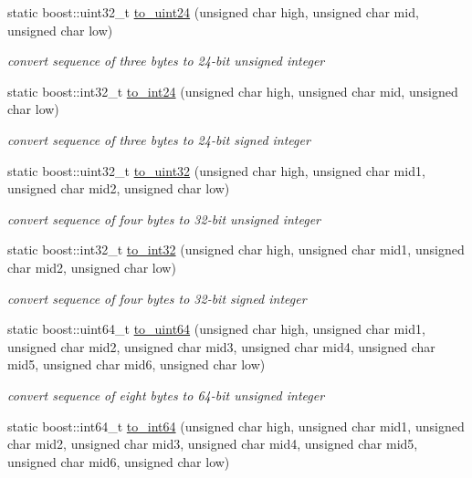 \begin{DoxyCompactItemize}
static boost\-::uint32\-\_\-t \hyperlink{structpion_1_1algorithm_ad1fd95bf2a6c3c2a775492c1acd0b5c1}{to\-\_\-uint24} (unsigned char high, unsigned char mid, unsigned char low)
\begin{DoxyCompactList}\small\item\em convert sequence of three bytes to 24-\/bit unsigned integer \end{DoxyCompactList}\item 
static boost\-::int32\-\_\-t \hyperlink{structpion_1_1algorithm_a607abc832ec9f6983cb42b76cc8914e6}{to\-\_\-int24} (unsigned char high, unsigned char mid, unsigned char low)
\begin{DoxyCompactList}\small\item\em convert sequence of three bytes to 24-\/bit signed integer \end{DoxyCompactList}\item 
static boost\-::uint32\-\_\-t \hyperlink{structpion_1_1algorithm_af2092366e2a82fbfc456bceb15a0f599}{to\-\_\-uint32} (unsigned char high, unsigned char mid1, unsigned char mid2, unsigned char low)
\begin{DoxyCompactList}\small\item\em convert sequence of four bytes to 32-\/bit unsigned integer \end{DoxyCompactList}\item 
static boost\-::int32\-\_\-t \hyperlink{structpion_1_1algorithm_ac8dd9cfadaa3fb758b4ea3f9bd524595}{to\-\_\-int32} (unsigned char high, unsigned char mid1, unsigned char mid2, unsigned char low)
\begin{DoxyCompactList}\small\item\em convert sequence of four bytes to 32-\/bit signed integer \end{DoxyCompactList}\item 
static boost\-::uint64\-\_\-t \hyperlink{structpion_1_1algorithm_ab4622cfb454d0ca206ffe42077a15c52}{to\-\_\-uint64} (unsigned char high, unsigned char mid1, unsigned char mid2, unsigned char mid3, unsigned char mid4, unsigned char mid5, unsigned char mid6, unsigned char low)
\begin{DoxyCompactList}\small\item\em convert sequence of eight bytes to 64-\/bit unsigned integer \end{DoxyCompactList}\item 
static boost\-::int64\-\_\-t \hyperlink{structpion_1_1algorithm_aa08271822b58fa0ca87fb4f0740b1d3a}{to\-\_\-int64} (unsigned char high, unsigned char mid1, unsigned char mid2, unsigned char mid3, unsigned char mid4, unsigned char mid5, unsigned char mid6, unsigned char low)

\end{DoxyCompactItemize}
